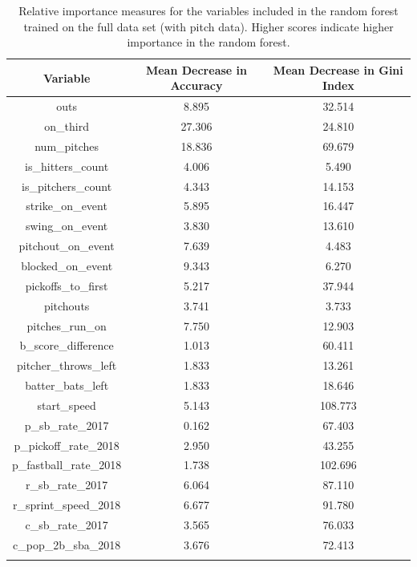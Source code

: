 \documentclass{article}
\begin{document}
\begin{longtable}{c c c}
    \hline
    Variable & Mean Decrease in Accuracy & Mean Decrease in Gini Index \\
    \hline
    outs & 8.895 & 32.514 \\
    on\_third & 27.306 & 24.810 \\
    num\_pitches & 18.836 & 69.679 \\
    is\_hitters\_count & 4.006 & 5.490 \\
    is\_pitchers\_count & 4.343 & 14.153 \\
    strike\_on\_event & 5.895 & 16.447 \\
    swing\_on\_event & 3.830 & 13.610 \\
    pitchout\_on\_event & 7.639 & 4.483 \\
    blocked\_on\_event & 9.343 & 6.270 \\
    pickoffs\_to\_first & 5.217 & 37.944 \\
    pitchouts & 3.741 & 3.733 \\
    pitches\_run\_on & 7.750 & 12.903 \\
    b\_score\_difference & 1.013 & 60.411 \\
    pitcher\_throws\_left & 1.833 & 13.261 \\
    batter\_bats\_left & 1.833 & 18.646 \\
    start\_speed & 5.143 & 108.773 \\
    p\_sb\_rate\_2017 & 0.162 & 67.403 \\
    p\_pickoff\_rate\_2018 & 2.950 & 43.255 \\
    p\_fastball\_rate\_2018 & 1.738 & 102.696 \\
    r\_sb\_rate\_2017 & 6.064 & 87.110 \\
    r\_sprint\_speed\_2018 & 6.677 & 91.780 \\
    c\_sb\_rate\_2017 & 3.565 & 76.033 \\
    c\_pop\_2b\_sba\_2018 & 3.676 & 72.413 \\
    \hline
    \caption{Relative importance measures for the variables included in the random forest trained on the full data set (with pitch data). Higher scores indicate higher importance in the random forest.}
    \label{tab5_importance}
\end{longtable}

\vspace{0.25cm}
\end{document}
